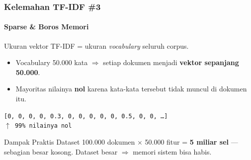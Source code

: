 \documentclass[t,aspectratio=169,xcolor=dvipsnames]{beamer}
\begin{document}
\begin{frame}
    \frametitle{Kelemahan TF-IDF \#3}
    \framesubtitle{Sparse \& Boros Memori}
    \small
    Ukuran vektor TF-IDF = ukuran \textit{vocabulary} seluruh corpus.
    \vspace{0.4em}
    \begin{itemize}
        \item Vocabulary 50.000 kata $\Rightarrow$ setiap dokumen menjadi \textbf{vektor sepanjang 50.000}.
        \item Mayoritas nilainya \textbf{nol} karena kata-kata tersebut tidak muncul di dokumen itu.
    \end{itemize}
    \vspace{0.3em}
    \begin{tcolorbox}[colback=gray!10, colframe=gray!40]
        \texttt{\small [0, 0, 0, 0, 0.3, 0, 0, 0, 0, 0, 0.5, 0, 0, \ldots]}\\[0.15em]
        \texttt{\small \hspace{10.2em}$\uparrow$ 99\% nilainya nol}
    \end{tcolorbox}
    \vspace{0.3em}
    \begin{exampleblock}{Dampak Praktis}
        Dataset 100.000 dokumen $\times$ 50.000 fitur = \textbf{5 miliar sel} --- sebagian besar kosong.
        Dataset besar $\Rightarrow$ memori sistem bisa habis.
    \end{exampleblock}
\end{frame}
\end{document}
